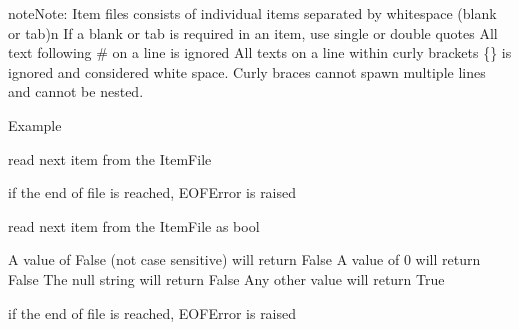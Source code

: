 \documentclass[letterpaper,10pt,english]{sphinxmanual}
\begin{document}
\begin{fulllineitems}
\begin{sphinxadmonition}{note}{Note:}
Item files consists of individual items separated by whitespace (blank or tab)\textbar{}n\textbar{}
If a blank or tab is required in an item, use single or double quotes 
All text following \# on a line is ignored 
All texts on a line within curly brackets \{\} is ignored and considered white space. 
Curly braces cannot spawn multiple lines and cannot be nested.

Example

\begin{sphinxVerbatim}[commandchars=\\\{\}]
      
   
\end{sphinxVerbatim}
\end{sphinxadmonition}

\begin{fulllineitems}
\label{\detokenize{Reference:salabim.ItemFile.read_item}}
read next item from the ItemFile

if the end of file is reached, EOFError is raised

\end{fulllineitems}


\begin{fulllineitems}
\label{\detokenize{Reference:salabim.ItemFile.read_item_bool}}
read next item from the ItemFile as bool

A value of False (not case sensitive) will return False 
A value of 0 will return False 
The null string will return False 
Any other value will return True

if the end of file is reached, EOFError is raised

\end{fulllineitems}



\end{fulllineitems}
\end{document}
